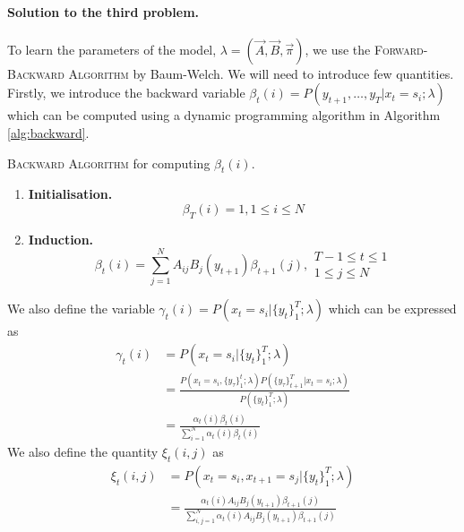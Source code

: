\paragraph{Solution to the third problem.}
	To learn the parameters of the model, $\lambda = \left( \vec A, \vec B, \vec \pi \right)$, we use the \textsc{Forward-Backward Algorithm} by Baum-Welch. We will need to introduce few quantities. Firstly, we introduce the backward variable $\beta_t(i) = P\left( y_{t + 1}, \dotsc, y_T | x_t = s_i; \lambda \right)$ which can be computed using a dynamic programming algorithm in Algorithm \ref{alg:backward}.
	\begin{algorithm}
		\caption{\textsc{Backward Algorithm} for computing $\beta_t(i)$.}
		\label{alg:backward}
		\begin{enumerate}
			\item
				\textbf{Initialisation.}
				$$\beta_T(i) = 1, 1 \leq i \leq N$$
			\item
				\textbf{Induction.}
				\begin{equation*}
					\beta_t(i) = \sum_{j = 1}^N A_{ij} B_j(y_{t + 1}) \beta_{t + 1}(j), 
					\begin{array}{lr}
						T - 1 \leq t \leq 1\\
						1 \leq j \leq N
					\end{array}
				\end{equation*}
		\end{enumerate}
	\end{algorithm}
We also define the variable $\gamma_t(i) = P\left( x_t = s_i | \{ y_t \}_1^T; \lambda \right)$ which can be expressed as
	\begin{align}
		\gamma_t(i) 	& = P\left( x_t = s_i | \{ y_t \}_1^T; \lambda \right) \nonumber\\
				& = \frac{ P\left( x_t = s_i, \{ y_\tau \}_1^t; \lambda \right)  P\left( \{ y_\tau \}_{t + 1}^T | x_t = s_i; \lambda \right)}{ P\left( \{ y_t \}_1^T; \lambda \right)} \nonumber\\
				& = \frac{\alpha_t(i) \beta_t(i)}{\sum_{i = 1}^N \alpha_t(i) \beta_t(i)} \label{eqn:hmmGamma}
	\end{align}
We also define the quantity $\xi_t(i, j)$ as
	\begin{align}
		\xi_t(i, j) 	& = P\left(x_t = s_i, x_{t + 1} = s_j | \{ y_t \}_1^T; \lambda \right) \nonumber\\
				& = \frac{\alpha_t(i) A_{ij} B_j(y_{t + 1}) \beta_{t + 1}(j)}{\sum_{i, j = 1}^N \alpha_t(i) A_{ij} B_j(y_{t + 1}) \beta_{t + 1}(j)}
	\end{align}
